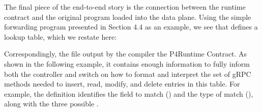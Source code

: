 \documentclass[letterpaper,11pt,english]{sphinxmanual}
\begin{document}
The final piece of the end-to-end story is the connection between the
runtime contract and the original program loaded into the data
plane. Using the simple forwarding program presented in Section 4.4 as
an example, we see that  defines a lookup table, which
we restate here:

\begin{sphinxVerbatim}[commandchars=\\\{\}]
  
      
         
      
      
      
\end{sphinxVerbatim}

Correspondingly, the file  output by the compiler
 the P4Runtime Contract. As shown in the following example,
it contains enough information to fully inform both the controller and
switch on how to format and interpret the set of gRPC methods needed
to insert, read, modify, and delete entries in this table. For
example, the  definition identifies the field to match
() and the type of match (), along with the
three possible .
\end{document}
